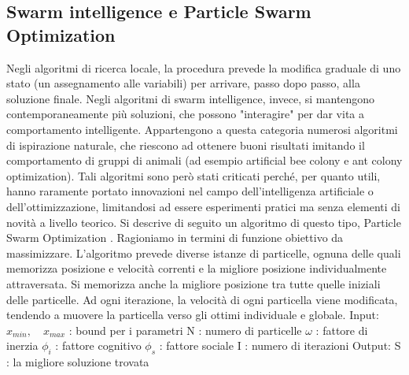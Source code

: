 \documentclass[12pt]{article}
\begin{document}
\subsection*{Swarm intelligence e Particle Swarm Optimization}

Negli algoritmi di ricerca locale, la procedura prevede la modifica graduale di uno stato (un assegnamento alle variabili) per arrivare, passo dopo passo, alla soluzione finale. Negli algoritmi di swarm intelligence, invece, si mantengono contemporaneamente più soluzioni, che possono "interagire" per dar vita a comportamento intelligente. Appartengono a questa categoria numerosi algoritmi di ispirazione naturale, che riescono ad ottenere buoni risultati imitando il comportamento di gruppi di animali (ad esempio artificial bee colony e ant colony optimization). Tali algoritmi sono però stati criticati perché, per quanto utili, hanno raramente portato innovazioni nel campo dell'intelligenza artificiale o dell'ottimizzazione, limitandosi ad essere esperimenti pratici ma senza elementi di novità a livello teorico. \cite{Sorensen2015}\newline
\newline
Si descrive di seguito un algoritmo di questo tipo, Particle Swarm Optimization \cite{KennedyEberhart1995}. Ragioniamo in termini di funzione obiettivo da massimizzare. L'algoritmo prevede diverse istanze di particelle, ognuna delle quali memorizza posizione e velocità correnti e la migliore posizione individualmente attraversata. Si memorizza anche la migliore posizione tra tutte quelle iniziali delle particelle. Ad ogni iterazione, la velocità di ogni particella viene modificata, tendendo a muovere la particella verso gli ottimi individuale e globale.\newline
\newline
Input:\newline
\tab \tab $x_{min}, \quad x_{max}$ : bound per i parametri
\tab \tab N : numero di particelle \newline
\tab \tab $\omega$ : fattore di inerzia \newline
\tab \tab $\phi_i$ : fattore cognitivo \newline
\tab \tab $\phi_s$ : fattore sociale \newline
\tab \tab I : numero di iterazioni \newline
\newline
Output: \newline
\tab \tab S : la migliore soluzione trovata \newline
\end{document}

